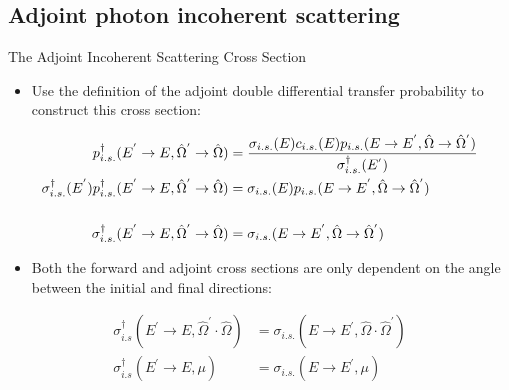 \documentclass{beamer}
\begin{document}
\subsection{Adjoint photon incoherent scattering}
\begin{frame}{The Adjoint Incoherent Scattering Cross Section}
  
  \begin{itemize}
    \item Use the definition of the adjoint double differential transfer 
      probability to construct this cross section:
  \end{itemize}
  \begin{align}
    p_{i.s.}^{\dagger}(E^{'} \to E, \hat{\Omega}^{'} \to \hat{\Omega}) & =
    \frac{\sigma_{i.s.}(E)c_{i.s.}(E)
      p_{i.s.}(E \to E^{'},\hat{\Omega} \to \hat{\Omega}^{'})}
         {\sigma_{i.s.}^{\dagger}(E^{'})} \nonumber \\
         \sigma_{i.s.}^{\dagger}(E^{'})
         p_{i.s.}^{\dagger}(E^{'} \to E, \hat{\Omega}^{'} \to \hat{\Omega}) & = 
         \sigma_{i.s.}(E)p_{i.s.}(E \to E^{'},\hat{\Omega} \to \hat{\Omega}^{'})
         \nonumber \\ \medskip \nonumber \\
         \sigma_{i.s.}^{\dagger}(E^{'} \to E, \hat{\Omega}^{'} \to \hat{\Omega}) & = 
         \sigma_{i.s.}(E \to E^{'},\hat{\Omega} \to \hat{\Omega}^{'}) \nonumber
  \end{align}

  \begin{itemize}
    \item Both the forward and adjoint cross sections are only dependent on the 
      angle between the initial and final directions:
  \end{itemize}
  \begin{align}
    \sigma_{i.s}^{\dagger}(E^{'} \to E, \hat{\Omega}^{'} \cdot \hat{\Omega}) & = 
    \sigma_{i.s.}(E \to E^{'},\hat{\Omega} \cdot \hat{\Omega}^{'}) \nonumber \\
    \sigma_{i.s}^{\dagger}(E^{'} \to E, \mu) & = 
    \sigma_{i.s.}(E \to E^{'}, \mu) \nonumber
  \end{align}

\end{frame}
\end{document}
